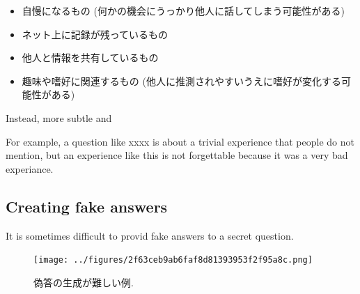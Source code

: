 \documentclass{article}
\begin{document}



\begin{itemize}
\item \textsf{自慢になるもの
(何かの機会にうっかり他人に話してしまう可能性がある)}

\vspace{-1mm}
\item \textsf{ネット上に記録が残っているもの}

\vspace{-1mm}
\item \textsf{他人と情報を共有しているもの}

\vspace{-1mm}
\item \textsf{趣味や嗜好に関連するもの
(他人に推測されやすいうえに嗜好が変化する可能性がある)}

\end{itemize}

\noindent
Instead, more subtle and


For example, a question like xxxx is about a trivial experience
that people do not mention, but an experience like this is
not forgettable because it was a very bad experiance.

\subsection{Creating fake answers}


It is sometimes difficult to provid fake answers to a secret question.

\begin{figure}[H]
\centerline{\texttt{[image: ../figures/2f63ceb9ab6faf8d81393953f2f95a8c.png]}}
\caption{偽答の生成が難しい例.}
\label{atmega}
\end{figure}
\end{document}
